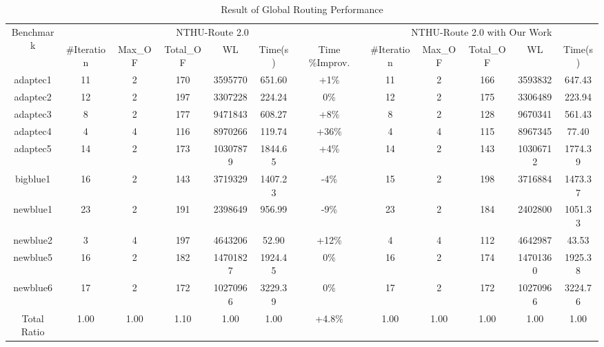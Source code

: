 \begin{table*}[htbp]
\caption{Result of Global Routing Performance}
\begin{center}
\begin{tabular}{|c|c|c|c|c|c|c|c|c|c|c|c|}
\hline
\multirow{2}{*}{Benchmark} & \multicolumn{6}{c|}{NTHU-Route 2.0}                                     & \multicolumn{5}{c|}{NTHU-Route 2.0 with Our Work}      \\ \cline{2-12} 
                           & \#Iteration & Max\_OF & Total\_OF & WL       & Time(s) & Time \%Improv. & \#Iteration & Max\_OF & Total\_OF & WL       & Time(s) \\ \hline
adaptec1                   & 11          & 2       & 170       & 3595770  & 651.60  & +1\%           & 11          & 2       & 166       & 3593832  & 647.43  \\ \hline
adaptec2                   & 12          & 2       & 197       & 3307228  & 224.24  & 0\%            & 12          & 2       & 175       & 3306489  & 223.94  \\ \hline
adaptec3                   & 8           & 2       & 177       & 9471843  & 608.27  & +8\%           & 8           & 2       & 128       & 9670341  & 561.43  \\ \hline
adaptec4                   & 4           & 4       & 116       & 8970266  & 119.74  & +36\%          & 4           & 4       & 115       & 8967345  & 77.40   \\ \hline
adaptec5                   & 14          & 2       & 173       & 10307879 & 1844.65 & +4\%           & 14          & 2       & 143       & 10306712 & 1774.39 \\ \hline
bigblue1                   & 16          & 2       & 143       & 3719329  & 1407.23 & -4\%           & 15          & 2       & 198       & 3716884  & 1473.37 \\ \hline
newblue1                   & 23          & 2       & 191       & 2398649  & 956.99  & -9\%           & 23          & 2       & 184       & 2402800  & 1051.33 \\ \hline
newblue2                   & 3           & 4       & 197       & 4643206  & 52.90   & +12\%          & 4           & 4       & 112       & 4642987  & 43.53   \\ \hline
newblue5                   & 16          & 2       & 182       & 14701827 & 1924.45 & 0\%            & 16          & 2       & 174       & 14701360 & 1925.38 \\ \hline
newblue6                   & 17          & 2       & 172       & 10270966 & 3229.39 & 0\%            & 17          & 2       & 172       & 10270966 & 3224.76 \\ \hline
Total Ratio                & 1.00        & 1.00    & 1.10      & 1.00     & 1.00    & +4.8\%         & 1.00        & 1.00    & 1.00      & 1.00     & 1.00    \\ \hline
\end{tabular}
\label{tab:gr}
\end{center}
\end{table*}